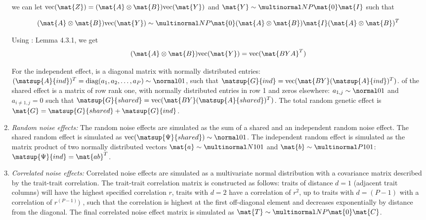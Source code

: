 \begin{enumerate}
we can let  \(\text{vec} (\mat{Z}) =  (\mat{A} \otimes \mat{B}) \text{vec} (\mat{Y})\)  and \(\mat{Y} \sim \multinormal N P {\mat{0}} {\mat{I}}\) such that

\begin{equation}
\begin{aligned}
(\mat{A} \otimes\mat{B}) \text{vec} (\mat{Y})  \sim \multinormal N P {\mat{0}} {(\mat{A} \otimes \mat{B}) \mat{I} (\mat{A} \otimes \mat{B})^T}
\end{aligned}
\end{equation}

Using \citep{Horn1991}: Lemma 4.3.1, we get 
\begin{equation}
(\mat{A} \otimes \mat{B}) \text{vec}(\mat{Y}) = \text{vec}(\mat{BYA}^T) 
\end{equation}

For the independent effect,  is a diagonal matrix with normally distributed entries: \((\matsup{A}{ind})^T = \text{diag}(a_1, a_2,  \dotsc , a_P) \sim \normal 0 1\), such that \(\matsup{G}{ind} =  \text{vec}(\mat{BY}(\matsup{A}{ind})^T) \).  of the shared effect is a matrix of row rank one, with normally distributed entries in row 1 and zeros elsewhere: \(a_{1,j} \sim \normal 0 1\) and \(a_{i \neq 1,j} = 0\) such that \(\matsup{G}{shared} =  \text{vec}(\mat{BY}(\matsup{A}{shared})^T) \). The total random genetic effect  is \(\mat{G} = \matsup{G}{shared} + \matsup{G}{ind}\). 

\item \textit{Random noise effects:} The random noise effects \tmat{\Psi} are simulated as the sum of a shared and an independent random noise effect. The shared random effect  is simulated as \(\text{vec}(\matsup{\Psi}{shared}) \sim \normal 0 1\). The independent random effect  is simulated as the matrix product of two normally distributed vectors \(\mat{a} \sim \multinormal N 1 0 1\) and \(\mat{b} \sim \multinormal P 1 0 1\): \(\matsup{\Psi}{ind} = \mat{ab}^T\).


\item \textit{Correlated noise effects:}  Correlated noise effects are simulated as a multivariate normal distribution with a covariance matrix described by the trait-trait correlation. The trait-trait correlation matrix  is constructed as follows: traits of distance \(d=1\) (adjacent trait columns) will have the highest specified correlation \(r\), traits with \(d=2\) have a correlation of \(r^2\), up to traits with \(d=(P - 1)\) with a correlation of \(r^{(P - 1)})\) , such that the correlation is highest at the first off-diagonal element and decreases exponentially by distance from the diagonal. The final correlated noise effect matrix is simulated as \(\mat{T} \sim \multinormal N P {\mat{0}} {\mat{C}}\).
\end{enumerate}

